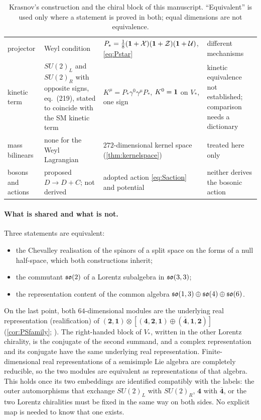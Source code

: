 \begin{table}[t]
\begin{tabular}{@{}>{\raggedright\arraybackslash}p{2.4cm}>{\raggedright\arraybackslash}p{4.0cm}>{\raggedright\arraybackslash}p{4.6cm}>{\raggedright\arraybackslash}p{3.6cm}@{}}
projector & Weyl condition & $P_*=\tfrac18(\mathbf 1+\mathcal X)(\mathbf 1+\mathcal Z)(\mathbf 1+\mathcal U)$, \cref{eq:Pstar} & different mechanisms\\
kinetic term & $SU(2)_L$ and $SU(2)_R$ with opposite signs, eq.~(219), stated to coincide with the SM kinetic term & $K^\mu=P_*\gamma^0\gamma^\mu P_*$, $K^0=\mathbf 1$ on $V_*$, one sign & kinetic equivalence not established; comparison needs a dictionary\\
mass bilinears & none for the Weyl Lagrangian & $272$-dimensional kernel space (\cref{thm:kernelspace}) & treated here only\\
bosons and actions & proposed $D\to D+C$; not derived & adopted action \eqref{eq:Saction} and potential & neither derives the bosonic action\\
\bottomrule
\end{tabular}
\caption{Krasnov's construction and the chiral block of this manuscript. ``Equivalent'' is used only where a statement is proved in both; equal
dimensions are not equivalence.}
\label{tab:krasnov}
\end{table}

\paragraph{What is shared and what is not.} Three statements are equivalent:
\begin{itemize}
\item the Chevalley realisation of the spinors of a split space on the forms of a null half-space, which both constructions inherit;
\item the commutant $\mathfrak{so}(2)$ of a Lorentz subalgebra in $\mathfrak{so}(3,3)$;
\item the representation content of the common algebra $\mathfrak{so}(1,3)\oplus\mathfrak{so}(4)\oplus\mathfrak{so}(6)$.
\end{itemize}
On the last point, both $64$-dimensional modules are the underlying real representation (realification) of
$(\mathbf2,\mathbf1)\otimes[(\mathbf4,\mathbf2,\mathbf1)\oplus(\bar{\mathbf4},\mathbf1,\mathbf2)]$ (\cref{cor:PSfamily}; \cite[\S6]{Krasnov18}).
The right-handed block of $V_*$, written in the other Lorentz chirality, is the conjugate of the second summand, and a complex
representation and its conjugate have the same underlying real representation. Finite-dimensional real representations of a semisimple Lie
algebra are completely reducible, so the two modules are equivalent as representations of that algebra. This holds once its two embeddings
are identified compatibly with the labels: the outer automorphisms that exchange $SU(2)_L$ with $SU(2)_R$, $\mathbf4$ with $\bar{\mathbf4}$, or
the two Lorentz chiralities must be fixed in the same way on both sides. No explicit map is needed to know that one exists.

